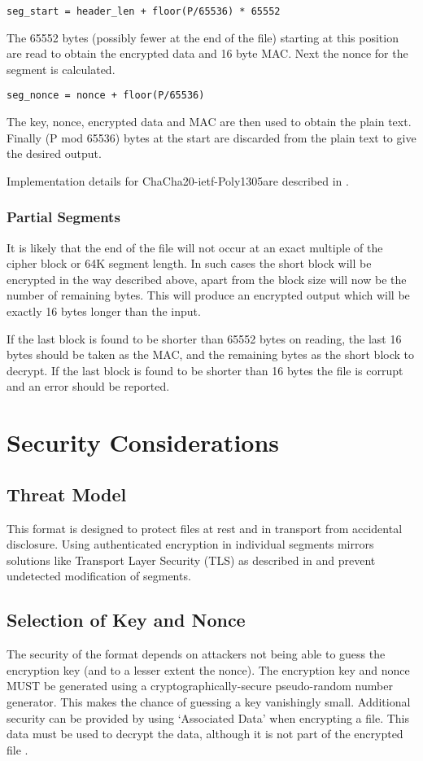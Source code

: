 \documentclass[10pt]{article}
\begin{document}
\begin{verbatim}
seg_start = header_len + floor(P/65536) * 65552
\end{verbatim}

The 65552 bytes (possibly fewer at the end of the file) starting at this position are read to obtain the encrypted
data and 16 byte MAC.
Next the nonce for the segment is calculated.

\begin{verbatim}
seg_nonce = nonce + floor(P/65536)
\end{verbatim}

The key, nonce, encrypted data and MAC are then used to obtain the plain text.
Finally (P mod 65536) bytes at the start are discarded from the plain text to give the desired output.

Implementation details for ChaCha20-ietf-Poly1305are described in \cite{RFC8439}.

\subsubsection{Partial Segments}
It is likely that the end of the file will not occur at an exact multiple of the cipher block or
64K segment length.
In such cases the short block will be encrypted in the way described above, apart from the block size will
now be the number of remaining bytes.
This will produce an encrypted output which will be exactly 16 bytes longer than the input.

If the last block is found to be shorter than 65552 bytes on reading, the last 16 bytes should be taken as
the MAC, and the remaining bytes as the short block to decrypt.
If the last block is found to be shorter than 16 bytes the file is corrupt and an error should be reported.

\section{Security Considerations}
\subsection{Threat Model}
This format is designed to protect files at rest and in transport from accidental disclosure.
Using authenticated encryption in individual segments mirrors solutions like Transport Layer
Security (TLS) as described in \cite{RFC5246} and prevent undetected modification of segments.

\subsection{Selection of Key and Nonce}
The security of the format depends on attackers not being able to guess the encryption key (and to a lesser extent
the nonce).
The encryption key and nonce MUST be generated using a cryptographically-secure pseudo-random number generator.
This makes the chance of guessing a key vanishingly small.
Additional security can be provided by using `Associated Data' when encrypting a file.
This data must be used to decrypt the data, although it is not part of the encrypted file
\cite{RFC8439}.
\end{document}
